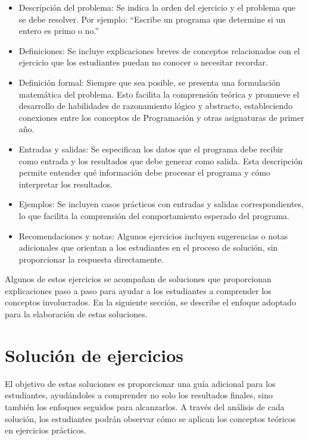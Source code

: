 \documentclass{article}
\begin{document}
\begin{itemize}
    \item Descripción del problema:  
    Se indica la orden del ejercicio y el problema que se debe resolver. Por ejemplo: ``Escribe un programa que determine si un entero es primo o no.''

    \item Definiciones: 
    Se incluye explicaciones breves de conceptos relacionados con el ejercicio que los estudiantes puedan no conocer o necesitar recordar.

    \item Definición formal:
    Siempre que sea posible, se presenta una formulación matemática del problema. Esto facilita la comprensión teórica y promueve el desarrollo de habilidades de razonamiento lógico y abstracto, estableciendo conexiones entre los conceptos de Programación y otras asignaturas de primer año.
    
    \item Entradas y salidas:
    Se especifican los datos que el programa debe recibir como entrada y los resultados que debe generar como salida. Esta descripción permite entender qué información debe procesar el programa y cómo interpretar los resultados.

    \item Ejemplos:
    Se incluyen casos prácticos con entradas y salidas correspondientes, lo que facilita la comprensión del comportamiento esperado del programa.
    
    \item Recomendaciones y notas:  
     Algunos ejercicios incluyen sugerencias o notas adicionales que orientan a los estudiantes en el proceso de solución, sin proporcionar la respuesta directamente.
\end{itemize}

Algunos de estos ejercicios se acompañan de soluciones que proporcionan explicaciones paso a paso para ayudar a los estudiantes a comprender los conceptos involucrados. En la siguiente sección, se describe el enfoque adoptado para la elaboración de estas soluciones.

\section{Solución de ejercicios}

El objetivo de estas soluciones es proporcionar una guía adicional para los estudiantes, ayudándoles a comprender no solo los resultados finales, sino también los enfoques seguidos para alcanzarlos. A través del análisis de cada solución, los estudiantes podrán observar cómo se aplican los conceptos teóricos en ejercicios prácticos.
\end{document}
